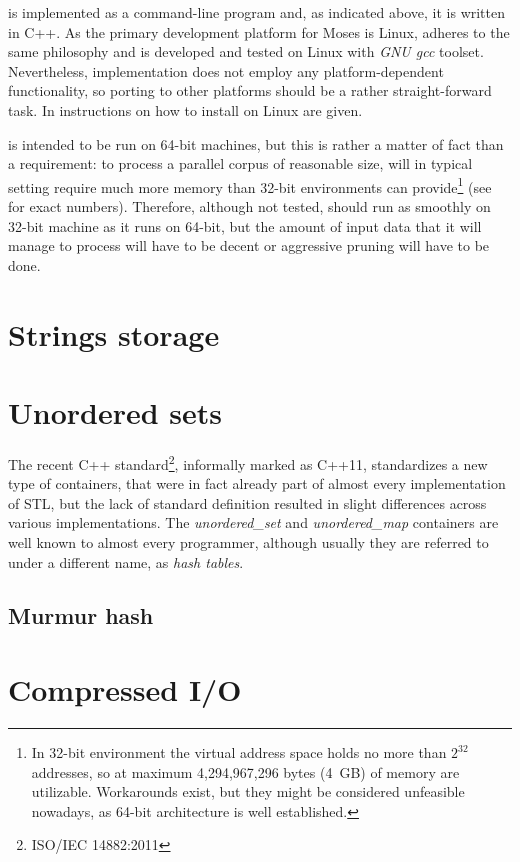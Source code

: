 
\Eppex{} is implemented as a command-line program and, as indicated above, it is written in C++.
As the primary development platform for Moses is Linux,
\eppex{} adheres to the same philosophy and is developed and tested on Linux with \emph{GNU gcc}
toolset.
Nevertheless, \eppex{} implementation does not employ any platform-dependent functionality,
so porting to other platforms should be a rather straight-forward task.
In  instructions on how to install \eppex{} on Linux are given.

\Eppex{} is intended to be run on 64-bit machines, but this is rather a matter of fact than
a requirement: to process a parallel corpus of reasonable size, \eppex{} will in typical
setting require much more memory than 32-bit environments can provide\footnote{In 32-bit
environment the virtual address space holds no more than $2^{32}$ addresses, so at maximum
4,294,967,296 bytes (4~GB) of memory are utilizable. Workarounds exist, but they might be
considered unfeasible nowadays, as 64-bit architecture is well established.} (see 
for exact numbers).
Therefore, although not tested, \eppex{} should run as smoothly on 32-bit machine as it runs
on 64-bit, but the amount of input data that it will manage to process will have to be decent
or aggressive pruning will have to be done.

\section{Strings storage}

\section{Unordered sets}

The recent C++ standard\footnote{ISO/IEC 14882:2011}, informally marked as C++11, standardizes
a new type of containers, that were in fact already part of almost every implementation of STL,
but the lack of standard definition resulted in slight differences across various implementations.
The \emph{unordered_set} and \emph{unordered_map} containers are well known to almost every
programmer, although usually they are referred to under a different name, as \emph{hash tables}.

\subsection{Murmur hash}

\section{Compressed I/O}
